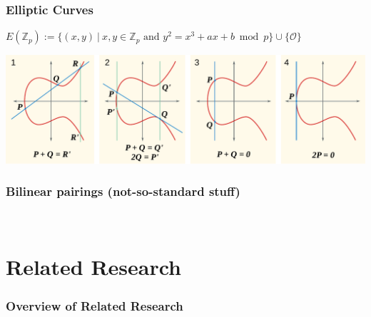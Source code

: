 \begin{frame}[c]
    \frametitle{Elliptic Curves }
    \begin{center}
        \Large
        $E(\mathbb{Z}_p) := \{(x, y)~|~x,y \in \mathbb{Z}_p \text{ and } y^2 = x^3 + a x + b \bmod{p}\} \cup \{\mathcal{O}\}$
    \end{center}
    \includegraphics[width=\textwidth]{../thesis/figures/ecc_point_addition.pdf}
\end{frame}

\begin{frame}[c]
    \frametitle{Bilinear pairings (not-so-standard stuff)}
    \begin{center}
          \\
        \vspace{0.5cm}
    \end{center}
\end{frame}



\section{Related Research}
\begin{frame}[c]
    \frametitle{Overview of Related Research}
    \begin{center}
        
    \end{center}
\end{frame}

